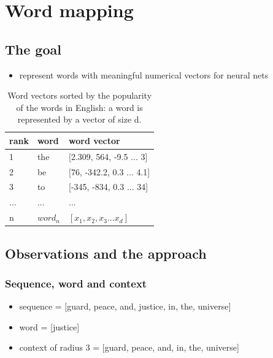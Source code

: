 \documentclass{article}
\begin{document}
\section{Word mapping}

\subsection{The goal}
\begin{itemize}
	\item represent words with meaningful numerical vectors for neural nets
\end{itemize}
\begin{table}[H]
	\centering
	\begin{tabularx}{\textwidth}{|X|X|X|} \hline
		rank & word & word vector \\ \hline
		1 & the & [2.309, 564, -9.5 ... 3] \\ \hline
		2 & be & [76, -342.2, 0.3 ... 4.1] \\ \hline
		3 & to & [-345, -834, 0.3 ... 34] \\ \hline
		... & ... & ... \\ \hline
		n & $ word_n $ & $ [x_1, x_2, x_3 ... x_d] $ \\ \hline
	\end{tabularx}
	\caption{Word vectors sorted by the popularity of the words in English: a 
	word is represented by a vector of size d.}
	\label{tab:word}
\end{table}

\subsection{Observations and the approach}

\subsubsection{Sequence, word and context}
\begin{itemize}
	\item sequence = [guard, peace, and, justice, in, the, universe]
	\item word = [justice]
	\item context of radius 3 = [guard, peace, and, in, the, universe]
\end{itemize}
\end{document}
